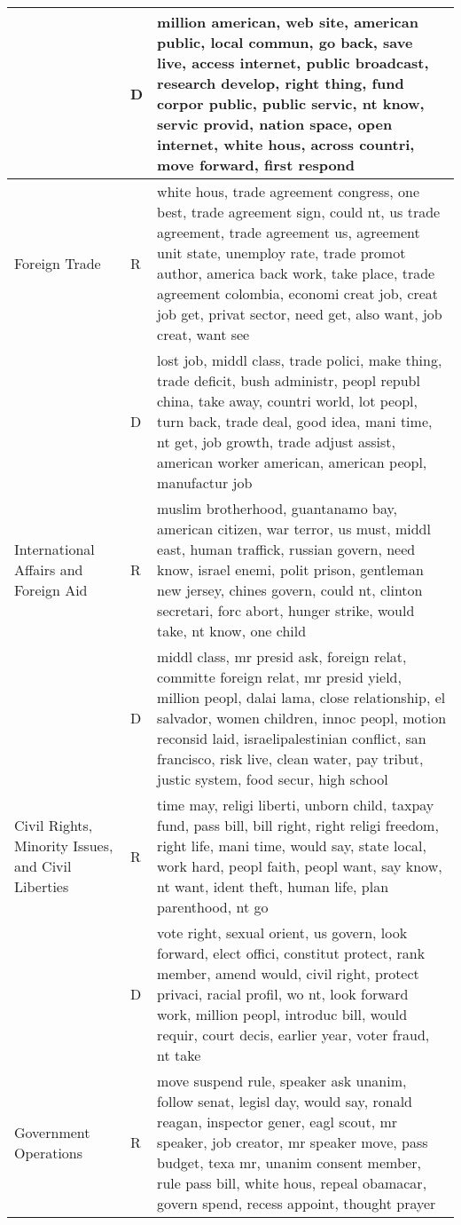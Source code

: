 \begin{longtable}{p{}p{}p{}}
   & D & million american, web site, american public, local commun, go back, save live, access internet, public broadcast, research develop, right thing, fund corpor public, public servic, nt know, servic provid, nation space, open internet, white hous, across countri, move forward, first respond \\ 
   \hline
Foreign Trade & R & white hous, trade agreement congress, one best, trade agreement sign, could nt, us trade agreement, trade agreement us, agreement unit state, unemploy rate, trade promot author, america back work, take place, trade agreement colombia, economi creat job, creat job get, privat sector, need get, also want, job creat, want see \\ 
   & D & lost job, middl class, trade polici, make thing, trade deficit, bush administr, peopl republ china, take away, countri world, lot peopl, turn back, trade deal, good idea, mani time, nt get, job growth, trade adjust assist, american worker american, american peopl, manufactur job \\ 
   \hline
International Affairs and Foreign Aid & R & muslim brotherhood, guantanamo bay, american citizen, war terror, us must, middl east, human traffick, russian govern, need know, israel enemi, polit prison, gentleman new jersey, chines govern, could nt, clinton secretari, forc abort, hunger strike, would take, nt know, one child \\ 
   & D & middl class, mr presid ask, foreign relat, committe foreign relat, mr presid yield, million peopl, dalai lama, close relationship, el salvador, women children, innoc peopl, motion reconsid laid, israelipalestinian conflict, san francisco, risk live, clean water, pay tribut, justic system, food secur, high school \\ 
   \hline
Civil Rights, Minority Issues, and Civil Liberties & R & time may, religi liberti, unborn child, taxpay fund, pass bill, bill right, right religi freedom, right life, mani time, would say, state local, work hard, peopl faith, peopl want, say know, nt want, ident theft, human life, plan parenthood, nt go \\ 
   & D & vote right, sexual orient, us govern, look forward, elect offici, constitut protect, rank member, amend would, civil right, protect privaci, racial profil, wo nt, look forward work, million peopl, introduc bill, would requir, court decis, earlier year, voter fraud, nt take \\ 
   \hline
Government Operations & R & move suspend rule, speaker ask unanim, follow senat, legisl day, would say, ronald reagan, inspector gener, eagl scout, mr speaker, job creator, mr speaker move, pass budget, texa mr, unanim consent member, rule pass bill, white hous, repeal obamacar, govern spend, recess appoint, thought prayer \\ 

\end{longtable}

